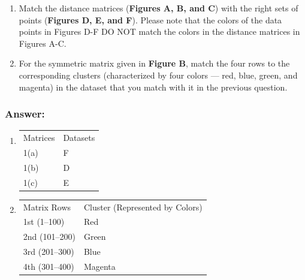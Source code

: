 \documentclass{article}
\begin{document}
\begin{enumerate}[label= (\alph*)]
    \item Match the distance matrices (\textbf{Figures A, B, and C}) with the right sets of points (\textbf{Figures D, E, and F}). Please note that the colors of the data points in Figures D-F DO NOT match the colors in the distance matrices in Figures A-C.
    \item For the symmetric matrix given in \textbf{Figure B}, match the four rows to the corresponding clusters (characterized by four colors --- red, blue, green, and magenta) in the dataset that you match with it in the previous question.
\end{enumerate}

\subsubsection*{Answer:}
\begin{enumerate}[label= (\alph*)]
    \item \begin{table}[ht]
        \centering
        \begin{tabular}{ll}
        Matrices & Datasets \\
        1(a) & F \\
        1(b) & D \\
        1(c) & E
        \end{tabular}
    \end{table}
    \item     \begin{table}[ht]
        \centering
        \begin{tabular}{ll}
        Matrix Rows   & Cluster (Represented by Colors) \\
        1st (1--100)   & Red \\
        2nd (101--200) & Green \\
        3rd (201--300) & Blue \\
        4th (301--400) & Magenta
        \end{tabular}
    \end{table}
\end{enumerate}
\end{document}
